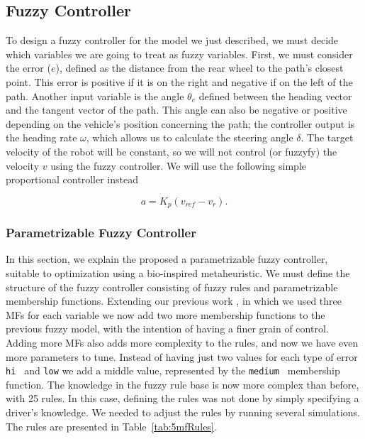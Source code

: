 \documentclass[symmetry,article,submit,moreauthors,pdftex]{Definitions/mdpi}
\begin{document}
\subsection{Fuzzy Controller}%
    \label{sub:FuzzyControllers}

To design a fuzzy controller for the model we just described, we must decide which 
variables we are going to treat as fuzzy variables. 
First, we must consider the error ($e$), defined as the distance from the rear wheel to the
path's closest point. This error is positive if it is on the right and
negative if on the left of the path. Another input variable is the angle
$\theta_e$ defined between the heading vector and the tangent vector of the
path. This angle can also be negative or positive depending on the vehicle's
position concerning the path; the controller output is the heading rate
$\omega$, which allows us to calculate the steering angle $\delta$. The target
velocity of the robot will be constant, so we will not control (or fuzzyfy) the
velocity $v$ using the fuzzy controller. We will use the following simple
proportional controller instead

\begin{equation}
    a = K_p(v_{ref}-v_r).
\end{equation}

\subsubsection{Parametrizable Fuzzy Controller}
In this section, we explain the proposed a parametrizable fuzzy controller,
suitable to optimization using a bio-inspired metaheuristic. We must define 
the structure of the fuzzy controller consisting of fuzzy rules and parametrizable 
membership functions.
Extending our previous work \cite{Mancilla2021}, in which we used three MFs for each 
variable we now add two more 
membership functions to the previous fuzzy model, with the intention
of having a finer grain of control. Adding more MFs also adds more
complexity to the rules, and now we have even more parameters to tune.  Instead
of having just two values for each type of error { \tt hi } and {\tt low} we
add a middle value, represented by the { \tt medium } membership function. The
knowledge in the fuzzy rule base is now more complex than before, with 25
rules. In this case, defining the rules was not done by simply specifying a
driver's knowledge. We needed to adjust the rules by running several
simulations. The rules are presented in Table~\ref{tab:5mfRules}.
\end{document}
